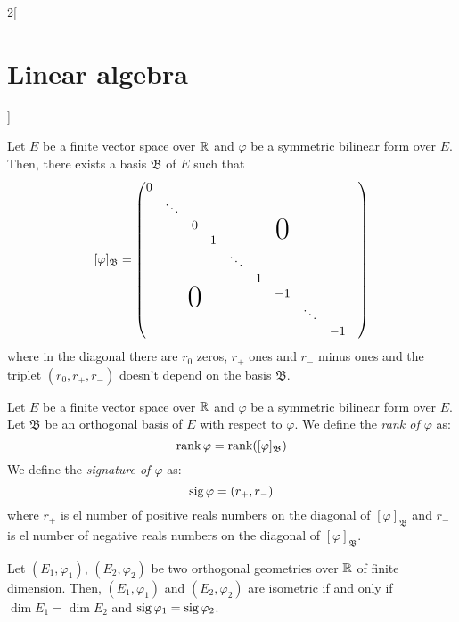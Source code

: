 \documentclass[../../../main.tex]{subfiles}
\begin{document}
\begin{multicols}{2}[\section{Linear algebra}]
\begin{prop}
\end{prop}
\begin{theorem}
    Let $E$ be a finite vector space over $\mathbb{R}$ and $\varphi$ be a symmetric bilinear form over $E$. Then, there exists a basis $\mathfrak{B}$ of $E$ such that $$[\varphi]_\mathfrak{B}=
    \begin{pmatrix}
        0 &&&&&&&&&\\
        & \ddots&&&&&&&\\
        && 0&&&&\bigzero&&\\
        &&& 1 &&&&&\\
        &&&& \ddots &&&&\\
        &&&&& 1 &&&\\
        &&\bigzero&&&& -1 &&\\
        &&&&&&&\ddots &\\
        &&&&&&&& -1
    \end{pmatrix}$$
    where in the diagonal there are $r_0$ zeros, $r_+$ ones and $r_-$ minus ones and the triplet $(r_0,r_+,r_-)$ doesn't depend on the basis $\mathfrak{B}$.
\end{theorem}
\begin{definition}
    Let $E$ be a finite vector space over $\mathbb{R}$ and $\varphi$ be a symmetric bilinear form over $E$. Let $\mathfrak{B}$ be an orthogonal basis of $E$ with respect to $\varphi$. We define the \textit{rank of $\varphi$} as: $$\rank \varphi=\rank ([\varphi]_\mathfrak{B})$$ We define the \textit{signature of $\varphi$} as: $$\operatorname{sig}\varphi=(r_+,r_-)$$ where $r_+$ is el number of positive reals numbers on the diagonal of $[\varphi]_\mathfrak{B}$ and $r_-$ is el number of negative reals numbers on the diagonal of $[\varphi]_\mathfrak{B}$.
\end{definition}
\begin{theorem}
    Let $(E_1,\varphi_1)$, $(E_2,\varphi_2)$ be two orthogonal geometries over $\mathbb{R}$ of finite dimension. Then, $(E_1,\varphi_1)$ and $(E_2,\varphi_2)$ are isometric if and only if $\dim E_1=\dim E_2$ and $\operatorname{sig} \varphi_1=\operatorname{sig} \varphi_2$.
\end{theorem}

\end{multicols}
\end{document}
